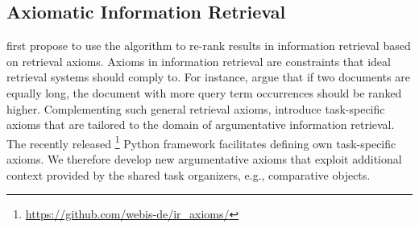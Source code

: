 \subsection{Axiomatic Information Retrieval}

\citet{HagenVGS2016} first propose to use the \KwikSort algorithm to re-rank results in information retrieval based on retrieval axioms.
Axioms in information retrieval are constraints that ideal retrieval systems should comply to.
For instance, \citet{FangTZ2004} argue that if two documents are equally long, the document with more query term occurrences should be ranked higher.
Complementing such general retrieval axioms, \citet{BondarenkoHVSPB2018} introduce task-specific axioms that are tailored to the domain of argumentative information retrieval.
The recently released \iraxioms\footnote{\url{https://github.com/webis-de/ir_axioms/}} Python framework facilitates defining own task-specific axioms.
We therefore develop new argumentative axioms that exploit additional context provided by the shared task organizers, e.g., comparative objects.
